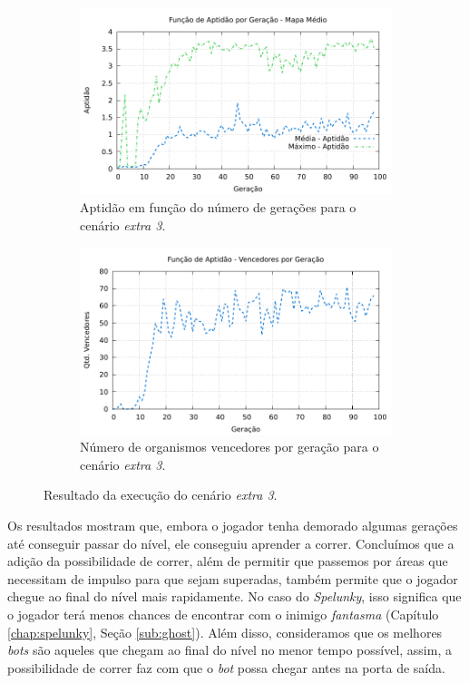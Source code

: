 \begin{figure}[H]
\centering
	\begin{subfigure}[b]{0.4\textwidth}
        \includegraphics[width=\textwidth]{fig/extra3-fitness.pdf}
        \caption{Aptidão em função do número de gerações para o cenário
        \textit{extra 3}.}
	\end{subfigure}
	\begin{subfigure}[b]{0.4\textwidth}
        \includegraphics[width=\textwidth]{fig/extra3-winners.pdf}
        \caption{Número de organismos vencedores por geração para o cenário
        \textit{extra 3}.}
	\end{subfigure}

    \caption{Resultado da execução do cenário \textit{extra 3}.}
	\label{fig:extra3-results}
\end{figure}


Os resultados mostram que, embora o jogador tenha demorado algumas gerações até
conseguir passar do nível, ele conseguiu aprender a correr. Concluímos que a
adição da possibilidade de correr, além de permitir que passemos por áreas que
necessitam de impulso para que sejam superadas, também permite que o jogador
chegue ao final do nível mais rapidamente. No caso do \textit{Spelunky}, isso
significa que o jogador terá menos chances de encontrar com o inimigo
\textit{fantasma} (Capítulo \ref{chap:spelunky}, Seção \ref{sub:ghost}). Além
disso, consideramos que os melhores \textit{bots} são aqueles que chegam ao
final do nível no menor tempo possível, assim, a possibilidade de correr faz
com que o \textit{bot} possa chegar antes na porta de saída.
